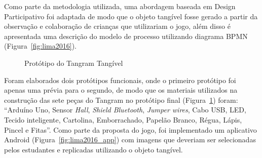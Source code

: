 Como parte da metodologia utilizada, uma abordagem baseada em Design Participativo foi adaptada de modo que o objeto tangível fosse gerado a partir da observação e colaboração de crianças que utilizariam o jogo, além disso é apresentada uma descrição do modelo de processo utilizando diagrama BPMN (Figura~\ref{fig:lima2016}).

\begin{figure}[htb]
	\center
	\qquad
	\captionsetup{justification=centering}
	\caption{Protótipo do Tangram Tangível}
	\label{fig:lima2016_prototipo}
\end{figure}

Foram elaborados dois protótipos funcionais, onde o primeiro protótipo foi apenas uma prévia para o segundo, de modo que os  materiais utilizados na construção das sete peças do Tangram no protótipo final (Figura~\ref{fig:lima2016_prototipo}) foram: ``Arduíno Uno, Sensor \textit{Hall}, \textit{Shield Bluetooth}, \textit{Jumper wires}, Cabo USB, LED, Tecido inteligente, Cartolina, Emborrachado, Papelão Branco, Régua, Lápis, Pincel e Fitas''. 
Como parte da proposta do jogo, foi implementado um aplicativo Android (Figura~\ref{fig:lima2016_app}) com imagens que deveriam ser selecionadas pelos estudantes e replicadas utilizando o objeto tangível.

